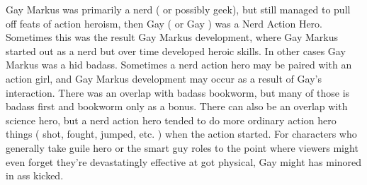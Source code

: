 \documentclass[12pt]{book}
\begin{document}
Gay Markus was primarily a nerd ( or possibly geek), but still managed to pull off feats of action heroism, then Gay ( or Gay ) was a Nerd Action Hero. Sometimes this was the result Gay Markus development, where Gay Markus started out as a nerd but over time developed heroic skills. In other cases Gay Markus was a hid badass. Sometimes a nerd action hero may be paired with an action girl, and Gay Markus development may occur as a result of Gay's interaction. There was an overlap with badass bookworm, but many of those is badass first and bookworm only as a bonus. There can also be an overlap with science hero, but a nerd action hero tended to do more ordinary action hero things ( shot, fought, jumped, etc. ) when the action started. For characters who generally take guile hero or the smart guy roles to the point where viewers might even forget they're devastatingly effective at got physical, Gay might has minored in ass kicked.
\end{document}
